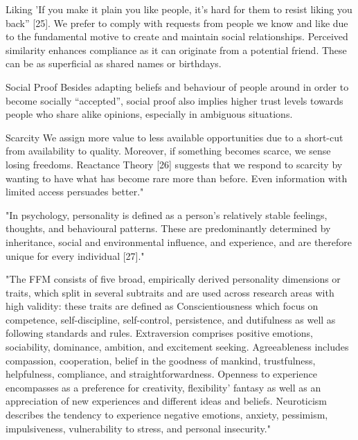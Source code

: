 Liking
'If you make it plain you like people, it's hard for them to resist liking you back” [25]. We prefer to comply with requests from people we know and like due to the fundamental motive to create and maintain social relationships. Perceived similarity enhances compliance as it can originate from a potential friend. These can be as superficial as shared names or birthdays.

Social Proof
Besides adapting beliefs and behaviour of people around in order to become socially “accepted”, social proof also implies higher trust levels towards people who share alike opinions, especially in ambiguous situations.

Scarcity
We assign more value to less available opportunities due to a short-cut from availability to quality. Moreover, if something becomes scarce, we sense losing freedoms. Reactance Theory [26] suggests that we respond to scarcity by wanting to have what has become rare more than before. Even information with limited access persuades better."\cite{7_mdpi}

"In psychology, personality is defined as a person's relatively stable feelings, thoughts, and behavioural patterns. These are predominantly determined by inheritance, social and environmental influence, and experience, and are therefore unique for every individual [27]."\cite{7_mdpi}


"The FFM consists of five broad, empirically derived personality dimensions or traits, which split in several subtraits and are used across research areas with high validity: these traits are defined as Conscientiousness which focus on competence, self-discipline, self-control, persistence, and dutifulness as well as following standards and rules. Extraversion comprises positive emotions, sociability, dominance, ambition, and excitement seeking. Agreeableness includes compassion, cooperation, belief in the goodness of mankind, trustfulness, helpfulness, compliance, and straightforwardness. Openness to experience encompasses as a preference for creativity, flexibility’ fantasy as well as an appreciation of new experiences and different ideas and beliefs. Neuroticism describes the tendency to experience negative emotions, anxiety, pessimism, impulsiveness, vulnerability to stress, and personal insecurity."\cite{7_mdpi}

